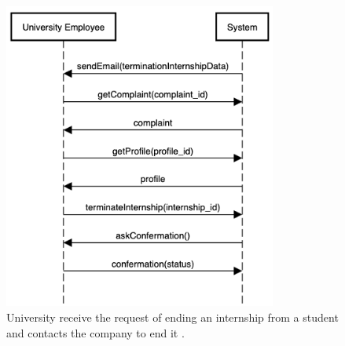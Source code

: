    \begin{figure}[H]
        \centering
        \includegraphics[width=0.8\textwidth]{RASD/Assets/SequenceDiagrams/8-student-end-internship.png}
        \caption{University receive the request of ending an internship from a student and contacts the company to end it .}
        \label{fig:University receive the request of ending an internship from a student and contact the company to end it }
    \end{figure}


